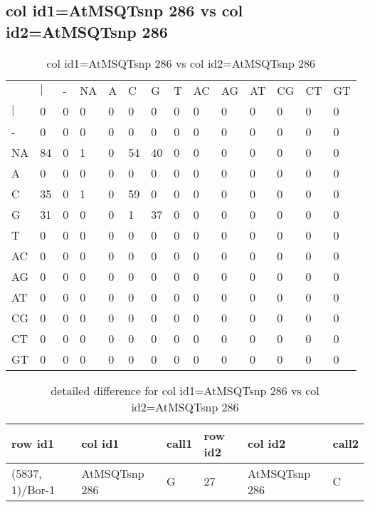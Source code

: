 \subsection{col id1=AtMSQTsnp 286 vs col id2=AtMSQTsnp 286}
\begin{center}
\begin{longtable}{|l|l|l|l|l|l|l|l|l|l|l|l|l|l|}
\caption{col id1=AtMSQTsnp 286 vs col id2=AtMSQTsnp 286} \label{table_dm828}\\
\hline
\\
\hline
&$|$&-&NA&A&C&G&T&AC&AG&AT&CG&CT&GT\\
$|$&0&0&0&0&0&0&0&0&0&0&0&0&0\\
-&0&0&0&0&0&0&0&0&0&0&0&0&0\\
NA&84&0&1&0&54&40&0&0&0&0&0&0&0\\
A&0&0&0&0&0&0&0&0&0&0&0&0&0\\
C&35&0&1&0&59&0&0&0&0&0&0&0&0\\
G&31&0&0&0&1&37&0&0&0&0&0&0&0\\
T&0&0&0&0&0&0&0&0&0&0&0&0&0\\
AC&0&0&0&0&0&0&0&0&0&0&0&0&0\\
AG&0&0&0&0&0&0&0&0&0&0&0&0&0\\
AT&0&0&0&0&0&0&0&0&0&0&0&0&0\\
CG&0&0&0&0&0&0&0&0&0&0&0&0&0\\
CT&0&0&0&0&0&0&0&0&0&0&0&0&0\\
GT&0&0&0&0&0&0&0&0&0&0&0&0&0\\
\hline
\end{longtable}
\end{center}

\begin{center}
\begin{longtable}{|l|l|l|l|l|l|}
\caption{detailed difference for col id1=AtMSQTsnp 286 vs col id2=AtMSQTsnp 286} \label{table_dm829}\\
\hline
row id1&col id1&call1&row id2&col id2&call2\\
\hline
(5837, 1)/Bor-1&AtMSQTsnp 286&G&27&AtMSQTsnp 286&C\\
\hline
\end{longtable}
\end{center}

